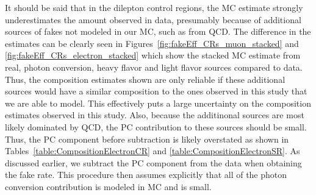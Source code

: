 It should be said that in the dilepton control regions, 
the MC estimate strongly underestimates the amount observed
in data, presumably because of additional sources of fakes 
not modeled in our MC, such as from QCD. 
The difference in the estimates can be clearly seen in Figures~\ref{fig:fakeEff_CRs_muon_stacked}
and \ref{fig:fakeEff_CRs_electron_stacked} which show the stacked MC estimate from real, photon conversion,
heavy flavor and light flavor sources compared to data.
Thus, the composition estimates shown are only reliable 
if these additional sources would have a similar composition to the ones observed
in this study that we are able to model. This effectively 
puts a large uncertainty on the composition estimates observed in this study. Also,
because the additinonal sources are most likely dominated by QCD, the PC 
contribution to these sources should be small. Thus, the PC component before subtraction
is likely overstated as shown in 
Tables~\ref{table:CompositionElectronCR} 
and \ref{table:CompositionElectronSR}.
As discussed earlier, we subtract the PC
component from the data when obtaining the fake rate. This procedure then assumes
explicitly that all of the photon conversion contribution is modeled in MC and is 
small.


